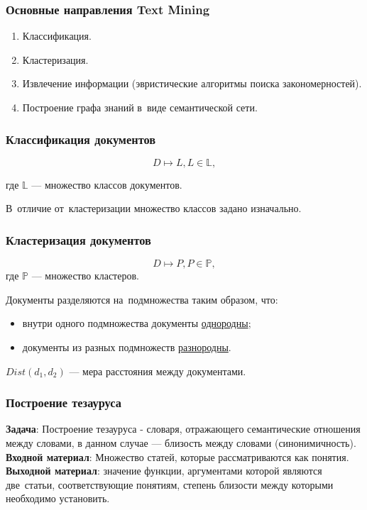 \documentclass{beamer}
\begin{document}
\begin{frame}
\frametitle{Основные направления Text Mining}
\begin{enumerate}
\item{Классификация.}
\item{Кластеризация.}
\item{Извлечение информации (эвристические алгоритмы поиска закономерностей).}
\item{Построение графа знаний в~виде семантической сети.}

\end{enumerate}
\end{frame}

\begin{frame}
\frametitle{Классификация документов}
$$D \mapsto L, L \in \mathbb{L},$$

где $\mathbb{L}$ --- множество классов документов.

\vspace{1cm}

В~отличие от~кластеризации множество классов задано изначально.
\end{frame}

\begin{frame}
\frametitle{Кластеризация документов}
$$D \mapsto P, P \in \mathbb{P},$$
где $\mathbb{P}$ --- множество кластеров.

\vspace{1cm}

Документы разделяются на~подмножества таким образом, что:

\begin{itemize}
\item{внутри одного подмножества документы \underline{однородны};}
\item{документы из разных подмножеств \underline{разнородны}.}
\end{itemize}

$Dist(d_{1},d_{2})$ --- мера расстояния между документами.
\end{frame}

\begin {frame}
\frametitle{Построение тезауруса}
\textbf{Задача}: Построение тезауруса - словаря, отражающего семантические отношения
между словами, в данном случае --- близость между словами (синонимичность).\\
\vspace{1cm}
\textbf{Входной материал}: Множество статей, которые рассматриваются как понятия.\\
\vspace{1cm}
\textbf{Выходной материал}: значение функции, аргументами которой являются две~статьи, 
соответствующие понятиям, степень близости между которыми необходимо установить.\\
\end{frame}
\end{document}
